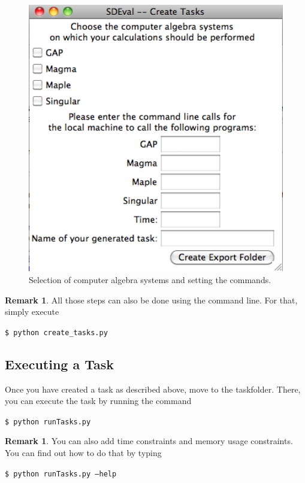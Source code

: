 \documentclass[11pt,a4paper]{amsart}
\numberwithin{equation}{section}
\theoremstyle{definition}
\newtheorem{remark}[theorem]{Remark}
\begin{document}
\begin{figure}[ht]
    \includegraphics[width=1\textwidth]{pics/window3.png}
    \caption{Selection of computer algebra systems and setting the commands.}
    \label{fig:window3}
\end{figure}

\begin{remark}
  All those steps can also be done using the command line. For that, simply execute

\texttt{\$ python create\_tasks.py}
\end{remark}
\newpage
\subsection{Executing a Task}


Once you have created a task as described above, move to the taskfolder. There, you can execute the task by running the command

\texttt{\$ python runTasks.py}

\begin{remark}
  You can also add time constraints and memory usage constraints. You can find out how to do that by typing

\texttt{\$ python runTasks.py --help}
\end{remark}
\end{document}
